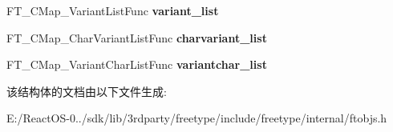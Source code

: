 \begin{DoxyCompactItemize}
\mbox{\label{struct_f_t___c_map___class_rec___ad61635444cbfc71c4259e74cb892c172}} 
F\+T\+\_\+\+C\+Map\+\_\+\+Variant\+List\+Func {\bfseries variant\+\_\+list}
\item 
\mbox{\label{struct_f_t___c_map___class_rec___a65db9dfa0e29b7de257dc8870532ab19}} 
F\+T\+\_\+\+C\+Map\+\_\+\+Char\+Variant\+List\+Func {\bfseries charvariant\+\_\+list}
\item 
\mbox{\label{struct_f_t___c_map___class_rec___ac1563590a0bac99082aa0996b94aad57}} 
F\+T\+\_\+\+C\+Map\+\_\+\+Variant\+Char\+List\+Func {\bfseries variantchar\+\_\+list}
\end{DoxyCompactItemize}


该结构体的文档由以下文件生成\+:\begin{DoxyCompactItemize}
\item 
E\+:/\+React\+O\+S-\/0../sdk/lib/3rdparty/freetype/include/freetype/internal/ftobjs.\+h\end{DoxyCompactItemize}
